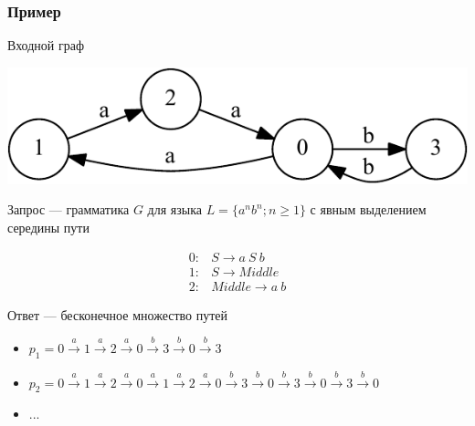 \documentclass[xcolor=table,aspectratio=169]{beamer}
\begin{document}
\begin{frame}[fragile]
  \transwipe[direction=90]
  \frametitle{Пример}
Входной граф 
\vspace{-0.5cm}
\begin{center}
        \includegraphics[height=0.2\textheight]{pictures/input.pdf} 
\end{center}
Запрос --- грамматика $G$ для языка $L=\{a^n b^n; n \geq 1\}$ с явным выделением середины пути \\
\begin{center}
   \[
\begin{array}{rl} 
   0:& S \rightarrow a \ S \ b \\
   1:& S \rightarrow Middle \\
   2:& Middle \rightarrow a \ b
\end{array}
\]
\end{center}
\vspace{0.8em}
Ответ --- бесконечное множество путей
\begin{itemize}
\item $p_1 = 0\xrightarrow{a}1\xrightarrow{a}2\xrightarrow{a}0\xrightarrow{b}3\xrightarrow{b}0\xrightarrow{b}3$
\item $p_2 = 0\xrightarrow{a}1\xrightarrow{a}2\xrightarrow{a}0\xrightarrow{a}1\xrightarrow{a}2\xrightarrow{a}0\xrightarrow{b}3\xrightarrow{b}0\xrightarrow{b}3\xrightarrow{b}0\xrightarrow{b}3\xrightarrow{b}0$
\item ...
\end{itemize}

\end{frame}
\end{document}
